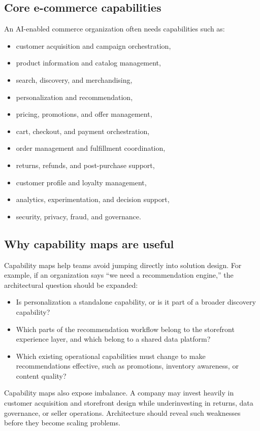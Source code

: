 \subsection{Core e-commerce capabilities}
An AI-enabled commerce organization often needs capabilities such as:
\begin{itemize}
  \item customer acquisition and campaign orchestration,
  \item product information and catalog management,
  \item search, discovery, and merchandising,
  \item personalization and recommendation,
  \item pricing, promotions, and offer management,
  \item cart, checkout, and payment orchestration,
  \item order management and fulfillment coordination,
  \item returns, refunds, and post-purchase support,
  \item customer profile and loyalty management,
  \item analytics, experimentation, and decision support,
  \item security, privacy, fraud, and governance.
\end{itemize}

\subsection{Why capability maps are useful}
Capability maps help teams avoid jumping directly into solution design.
For example, if an organization says ``we need a recommendation engine,'' the architectural question should be expanded:
\begin{itemize}
  \item Is personalization a standalone capability, or is it part of a broader discovery capability?
  \item Which parts of the recommendation workflow belong to the storefront experience layer, and which belong to a shared data platform?
  \item Which existing operational capabilities must change to make recommendations effective, such as promotions, inventory awareness, or content quality?
\end{itemize}

Capability maps also expose imbalance.
A company may invest heavily in customer acquisition and storefront design while underinvesting in returns, data governance, or seller operations.
Architecture should reveal such weaknesses before they become scaling problems.

